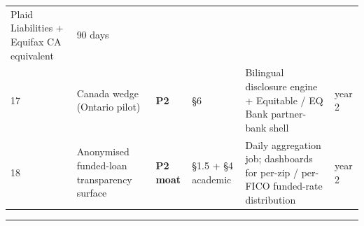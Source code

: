 \documentclass[
  10pt,
]{article}
\begin{document}
\begin{longtable}[]{@{}llllll@{}}
\begin{minipage}[t]{0.14\columnwidth}
Plaid Liabilities + Equifax CA equivalent\strut
\end{minipage} & \begin{minipage}[t]{0.14\columnwidth}\raggedright
90 days\strut
\end{minipage}\tabularnewline
\begin{minipage}[t]{0.14\columnwidth}\raggedright
17\strut
\end{minipage} & \begin{minipage}[t]{0.14\columnwidth}\raggedright
Canada wedge (Ontario pilot)\strut
\end{minipage} & \begin{minipage}[t]{0.14\columnwidth}\raggedright
\textbf{P2}\strut
\end{minipage} & \begin{minipage}[t]{0.14\columnwidth}\raggedright
§6\strut
\end{minipage} & \begin{minipage}[t]{0.14\columnwidth}\raggedright
Bilingual disclosure engine + Equitable / EQ Bank partner-bank shell\strut
\end{minipage} & \begin{minipage}[t]{0.14\columnwidth}\raggedright
year 2\strut
\end{minipage}\tabularnewline
\begin{minipage}[t]{0.14\columnwidth}\raggedright
18\strut
\end{minipage} & \begin{minipage}[t]{0.14\columnwidth}\raggedright
Anonymised funded-loan transparency surface\strut
\end{minipage} & \begin{minipage}[t]{0.14\columnwidth}\raggedright
\textbf{P2 moat}\strut
\end{minipage} & \begin{minipage}[t]{0.14\columnwidth}\raggedright
§1.5 + §4 academic\strut
\end{minipage} & \begin{minipage}[t]{0.14\columnwidth}\raggedright
Daily aggregation job; dashboards for per-zip / per-FICO funded-rate distribution\strut
\end{minipage} & \begin{minipage}[t]{0.14\columnwidth}\raggedright
year 2\strut
\end{minipage}\tabularnewline
\bottomrule
\end{longtable}

\begin{center}\rule{0.5\linewidth}{0.5pt}\end{center}
\end{document}
